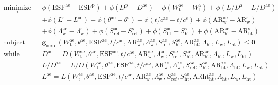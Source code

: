 \documentclass[11pt]{article}
\begin{document}
\begin{equation*}
    \begin{aligned}
        & \underset{\mathbf{x}}{\text{minimize}}
        & & \phi\left(\mathrm{ESF}^{\mathrm{ae}}-\mathrm{ESF}^{\mathrm{p}}\right)+\phi\left(D^{\mathrm{p}}-D^{\mathrm{ae}}\right)+\phi\left(W_{\mathrm{t}}^{\mathrm{ae}}-W_{\mathrm{t}}^{\mathrm{a}}\right)+\phi\left(L / D^{\mathrm{a}}-L / D^{\mathrm{ae}}\right) \\
    & & & +\phi\left(L^{\mathrm{s}}-L^{\mathrm{ae}}\right)+\phi\left(\theta^{\mathrm{ae}}-\theta^{\mathrm{s}}\right)+\phi\left(t / c^{\mathrm{ae}}-t / c^{\mathrm{s}}\right)+\phi\left(\mathrm{AR}_{\mathrm{w}}^{\mathrm{ae}}-\mathrm{AR}_{\mathrm{w}}^{\mathrm{s}}\right) \\
    & & & +\phi\left(\Lambda_{\mathrm{w}}^{\mathrm{ae}}-\Lambda_{\mathrm{w}}^{\mathrm{s}}\right)+\phi\left(S_{\mathrm{ref}}^{\mathrm{ae}}-S_{\mathrm{ref}}^{\mathrm{s}}\right)+\phi\left(S_{\mathrm{ht}}^{\mathrm{ae}}-S_{\mathrm{ht}}^{\mathrm{s}}\right)+\phi\left(\mathrm{AR}_{\mathrm{ht}}^{\mathrm{ae}}-\mathrm{AR}_{\mathrm{ht}}^{\mathrm{s}}\right) \\
    & \text{subject to}
        & & \mathbf{g}_{\text {aero }}\left(W_{\mathrm{t}}^{\mathrm{ae}}, \theta^{\mathrm{ae}}, \mathrm{ESF}^{\mathrm{ae}}, t / c^{\mathrm{ae}}, \mathrm{AR}_{\mathrm{w}}^{\mathrm{ae}}, \Lambda_{\mathrm{w}}^{\mathrm{ae}}, S_{\mathrm{ref}}^{\mathrm{ae}}, S_{\mathrm{ht}}^{\mathrm{ae}}, \mathrm{AR}_{\mathrm{ht}}^{\mathrm{ae}}, \Lambda_{\mathrm{ht}}, L_{\mathrm{w}}, L_{\mathrm{ht}}\right) \leq \mathbf{0} \\
    & \text{while solving}
        & & D^{\mathrm{ae}}=D\left(W_{\mathrm{t}}^{\mathrm{ae}}, \theta^{\mathrm{ae}}, \mathrm{ESF}^{\mathrm{ae}}, t / c^{\mathrm{ae}}, \mathrm{AR}_{\mathrm{w}}^{\mathrm{ae}}, \Lambda_{\mathrm{w}}^{\mathrm{ae}}, S_{\mathrm{ref}}^{\mathrm{ae}}, S_{\mathrm{ht}}^{\mathrm{ae}}, \mathrm{AR}_{\mathrm{ht}}^{\mathrm{ae}}, \Lambda_{\mathrm{ht}}, L_{\mathrm{w}}, L_{\mathrm{ht}}\right) \\
    & & & L / D^{\mathrm{ae}}=L / D\left(W_{\mathrm{t}}^{\mathrm{ae}}, \theta^{\mathrm{ae}}, \mathrm{ESF}^{\mathrm{ae}}, t / c^{\mathrm{ae}}, \mathrm{AR}_{\mathrm{w}}^{\mathrm{ae}}, \Lambda_{\mathrm{w}}^{\mathrm{ae}}, S_{\mathrm{ref}}^{\mathrm{ae}}, S_{\mathrm{ht}}^{\mathrm{ae}}, \mathrm{AR}_{\mathrm{ht}}^{\mathrm{ae}}, \Lambda_{\mathrm{ht}}, L_{\mathrm{w}}, L_{\mathrm{ht}}\right) \\
    & & & L^{\mathrm{ae}}=L\left(W_{\mathrm{t}}^{\mathrm{ae}}, \theta^{\mathrm{ae}}, \mathrm{ESF}^{\mathrm{ae}}, t / c^{\mathrm{ae}}, \mathrm{AR}_{\mathrm{w}}^{\mathrm{ae}}, \Lambda_{\mathrm{w}}^{\mathrm{ae}}, S_{\mathrm{ref}}^{\mathrm{ae}}, S_{\mathrm{ht}}^{\mathrm{ae}}, \mathrm{AR} \mathrm{ht}_{\mathrm{ht}}^{\mathrm{ae}}, \Lambda_{\mathrm{ht}}, L_{\mathrm{w}}, L_{\mathrm{ht}}\right) \\

\end{aligned}
\end{equation*}
\end{document}
